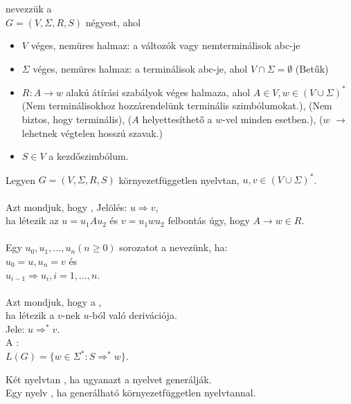 \begin{frame}
\begin{tcolorbox}[title={Def.: Környezetfüggetlen nyelvtan}]
 nevezzük a\\
$G = (V, {\Sigma}, R, S)$ négyest, ahol\\
\begin{itemize}
\item $V$ véges, nemüres halmaz: a változók vagy nemterminálisok abc-je
\item $\Sigma$ véges, nemüres halmaz: a terminálisok abc-je, ahol $V \cap \Sigma = \emptyset$ (Betűk)
\item $R : A \rightarrow w$ alakú átírási szabályok véges halmaza, ahol $A \in V, w \in (V \cup {\Sigma})^*$\\
(Nem terminálisokhoz hozzárendelünk terminális szimbólumokat.), (Nem biztos, hogy terminális), ($A$ helyettesíthető a $w$-vel minden esetben.), ($w$ $\rightarrow$ lehetnek végtelen hosszú szavak.)
\item $S \in V$ a kezdőszimbólum.
\end{itemize}
\end{tcolorbox}

\begin{tcolorbox}[title={Def.: Deriváció, közvetlen derivált}]
Legyen $G = (V, {\Sigma}, R, S)$ környezetfüggetlen nyelvtan, $u, v \in (V \cup {\Sigma})^*$.\\
\mmedskip
{}\\
Azt mondjuk, hogy , Jelölés: $u \Rightarrow v$,\\
ha létezik az $u = u_1Au_2$ és $v = u_1wu_2$ felbontás úgy, hogy $A  \rightarrow w \in R$.\\
\mmedskip
{}\\
Egy $u_0, u_1, ..., u_n (n \geq 0)$ sorozatot a  nevezünk, ha:\\
$u_0 = u, u_n = v$ és\\
$u_{i - 1} \Rightarrow u_i, i = 1, ..., n$.\\
\mmedskip
{}\\
Azt mondjuk, hogy a ,
\\ha létezik a $v$-nek $u$-ból való derivációja.\\
Jele: $u {\Rightarrow}^* v$.\\
\mmedskip
A :\\
$L(G) = \{w \in {\Sigma}^* : S {\Rightarrow}^* w\}$.

\end{tcolorbox}

\begin{tcolorbox}[squeezed title={Def.: Nyelvtanok ekvivalenciája, Környezetfüggetlen nyelv}]
Két nyelvtan , ha ugyanazt a nyelvet generálják.\\
Egy nyelv , ha generálható környezetfüggetlen nyelvtannal.
\end{tcolorbox}

\end{frame}

